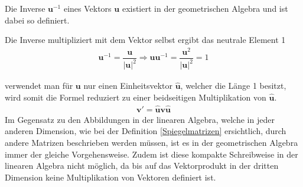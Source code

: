 Die Inverse $\mathbf{u}^{-1}$ eines Vektors $\mathbf{u}$ existiert in der geometrischen Algebra und ist dabei so definiert.
\begin{definition}
	Die Inverse multipliziert mit dem Vektor selbst ergibt das neutrale Element 1
	\begin{align}
		\mathbf{u}^{-1} = \dfrac{\mathbf{u}}{|\mathbf{u}|^2} \Rightarrow \mathbf{uu}^{-1} = \dfrac{\mathbf{u}^2}{|\mathbf{u}|^2} = 1
	\end{align}
\end{definition}

verwendet man für $\mathbf{u}$ nur einen Einheitsvektor $\mathbf{\hat{u}}$, welcher die Länge 1 besitzt, wird somit die Formel reduziert zu einer beidseitigen Multiplikation von $\mathbf{\hat{u}}$.
\begin{align}
	\mathbf{v'} = \mathbf{\hat{u}v\hat{u}}
\end{align}
Im Gegensatz zu den Abbildungen in der linearen Algebra, welche in jeder anderen Dimension, wie bei der Definition \eqref{Spiegelmatrizen} ersichtlich, durch andere Matrizen beschrieben werden müssen, ist es in der geometrischen Algebra immer der gleiche Vorgehensweise. Zudem ist diese kompakte Schreibweise in der linearen Algebra nicht möglich, da bis auf das Vektorprodukt in der dritten Dimension keine Multiplikation von Vektoren definiert ist. 